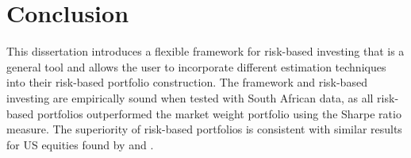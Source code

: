 \documentclass[
]{article}
\newenvironment{Shaded}{\begin{snugshade}}{\end{snugshade}}
\newcommand{\DataTypeTok}[1]{\textcolor[rgb]{0.13,0.29,0.53}{#1}}
\newcommand{\DecValTok}[1]{\textcolor[rgb]{0.00,0.00,0.81}{#1}}
\newcommand{\KeywordTok}[1]{\textcolor[rgb]{0.13,0.29,0.53}{\textbf{#1}}}
\newcommand{\NormalTok}[1]{#1}
\newcommand{\OperatorTok}[1]{\textcolor[rgb]{0.81,0.36,0.00}{\textbf{#1}}}
\newcommand{\StringTok}[1]{\textcolor[rgb]{0.31,0.60,0.02}{#1}}
\begin{document}
\begin{Shaded}
\end{Shaded}

\hypertarget{conclusion}{%
\section{Conclusion}\label{conclusion}}

This dissertation introduces a flexible framework for risk-based investing that is a general tool and
allows the user to incorporate different estimation techniques into their risk-based portfolio
construction. The framework and risk-based investing are empirically sound when tested with South African
data, as all risk-based portfolios outperformed the market weight portfolio using the Sharpe ratio
measure. The superiority of risk-based portfolios is consistent with similar results for US equities
found by \citet{DGL07} and \citet{K10}.
\end{document}

